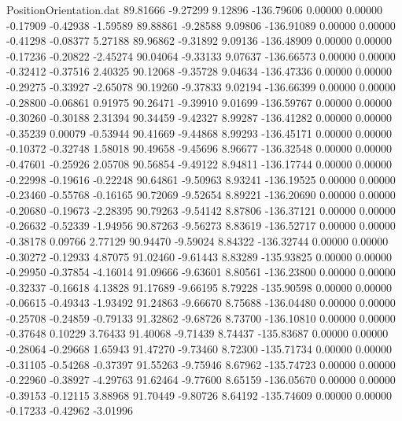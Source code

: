 \begin{filecontents}{PositionOrientation.dat}
  89.81666   -9.27299    9.12896  -136.79606    0.00000    0.00000   -0.17909   -0.42938   -1.59589
  89.88861   -9.28588    9.09806  -136.91089    0.00000    0.00000   -0.41298   -0.08377    5.27188
  89.96862   -9.31892    9.09136  -136.48909    0.00000    0.00000   -0.17236   -0.20822   -2.45274
  90.04064   -9.33133    9.07637  -136.66573    0.00000    0.00000   -0.32412   -0.37516    2.40325
  90.12068   -9.35728    9.04634  -136.47336    0.00000    0.00000   -0.29275   -0.33927   -2.65078
  90.19260   -9.37833    9.02194  -136.66399    0.00000    0.00000   -0.28800   -0.06861    0.91975
  90.26471   -9.39910    9.01699  -136.59767    0.00000    0.00000   -0.30260   -0.30188    2.31394
  90.34459   -9.42327    8.99287  -136.41282    0.00000    0.00000   -0.35239    0.00079   -0.53944
  90.41669   -9.44868    8.99293  -136.45171    0.00000    0.00000   -0.10372   -0.32748    1.58018
  90.49658   -9.45696    8.96677  -136.32548    0.00000    0.00000   -0.47601   -0.25926    2.05708
  90.56854   -9.49122    8.94811  -136.17744    0.00000    0.00000   -0.22998   -0.19616   -0.22248
  90.64861   -9.50963    8.93241  -136.19525    0.00000    0.00000   -0.23460   -0.55768   -0.16165
  90.72069   -9.52654    8.89221  -136.20690    0.00000    0.00000   -0.20680   -0.19673   -2.28395
  90.79263   -9.54142    8.87806  -136.37121    0.00000    0.00000   -0.26632   -0.52339   -1.94956
  90.87263   -9.56273    8.83619  -136.52717    0.00000    0.00000   -0.38178    0.09766    2.77129
  90.94470   -9.59024    8.84322  -136.32744    0.00000    0.00000   -0.30272   -0.12933    4.87075
  91.02460   -9.61443    8.83289  -135.93825    0.00000    0.00000   -0.29950   -0.37854   -4.16014
  91.09666   -9.63601    8.80561  -136.23800    0.00000    0.00000   -0.32337   -0.16618    4.13828
  91.17689   -9.66195    8.79228  -135.90598    0.00000    0.00000   -0.06615   -0.49343   -1.93492
  91.24863   -9.66670    8.75688  -136.04480    0.00000    0.00000   -0.25708   -0.24859   -0.79133
  91.32862   -9.68726    8.73700  -136.10810    0.00000    0.00000   -0.37648    0.10229    3.76433
  91.40068   -9.71439    8.74437  -135.83687    0.00000    0.00000   -0.28064   -0.29668    1.65943
  91.47270   -9.73460    8.72300  -135.71734    0.00000    0.00000   -0.31105   -0.54268   -0.37397
  91.55263   -9.75946    8.67962  -135.74723    0.00000    0.00000   -0.22960   -0.38927   -4.29763
  91.62464   -9.77600    8.65159  -136.05670    0.00000    0.00000   -0.39153   -0.12115    3.88968
  91.70449   -9.80726    8.64192  -135.74609    0.00000    0.00000   -0.17233   -0.42962   -3.01996

\end{filecontents}
